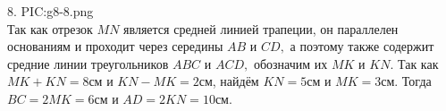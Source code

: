 8. {{PIC:g8-8.png}}\\
Так как отрезок $MN$ является средней линией трапеции, он параллелен основаниям и проходит через середины $AB$ и $CD,$ а поэтому также содержит средние линии треугольников $ABC$ и $ACD,$ обозначим их $MK$ и $KN.$ Так как $MK+KN=8$см и $KN-MK=2$см, найдём $KN=5$см и $MK=3$см. Тогда $BC=2MK=6$см и $AD=2KN=10$см.\\
